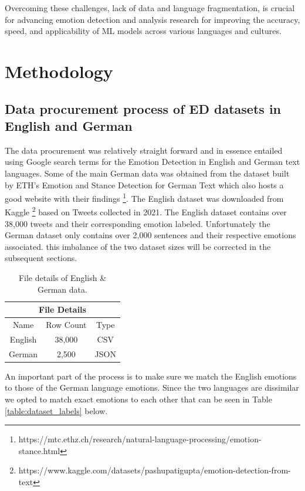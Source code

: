 \documentclass[11pt]{article}
\begin{document}
Overcoming these challenges, lack of data and language fragmentation, is crucial for advancing emotion detection and analysis research for improving the accuracy, speed, and applicability of ML models across various languages and cultures.

\clearpage
\section{Methodology}

\subsection{Data procurement process of ED datasets in English and German}
\label{sec:data-procurement-process}
The data procurement was relatively straight forward and in essence entailed using Google search terms for the Emotion Detection in English and German text languages. Some of the main German data was obtained from the dataset built by ETH's Emotion and Stance Detection for German Text \cite{mascarell-etal-2021-stance} which also hosts a good website with their findings \footnote{https://mtc.ethz.ch/research/natural-language-processing/emotion-stance.html}. The English dataset was downloaded from Kaggle \footnote{https://www.kaggle.com/datasets/pashupatigupta/emotion-detection-from-text} based on Tweets collected in 2021. The English dataset contains over 38,000 tweets and their corresponding emotion labeled. Unfortunately the German dataset only contains over 2,000 sentences and their respective emotions associated. this imbalance of the two dataset sizes will be corrected in the subsequent sections.

\begin{table}[h!]
\centering
\begin{tabular}{ | c | c | c | }
    \hline
    \multicolumn{3}{|c|}{File Details} \\
    \hline
    Name & Row Count & Type \\
    \hline
    English & 38,000 & CSV  \\
    German  &  2,500 & JSON \\
    \hline
\end{tabular}
\caption{File details of English \& German data.}
\label{table:file-details}
\end{table}

An important part of the process is to make sure we match the English emotions to those of the German language emotions. Since the two languages are dissimilar we opted to match exact emotions to each other that can be seen in Table \ref{table:dataset_labels} below.
\end{document}

